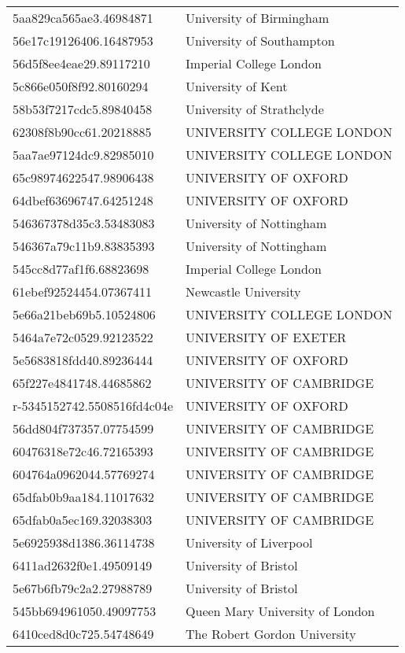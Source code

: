 \begin{tabular}{ll}
5aa829ca565ae3.46984871 & University of Birmingham \\
56e17c19126406.16487953 & University of Southampton \\
56d5f8ee4eae29.89117210 & Imperial College London \\
5c866e050f8f92.80160294 & University of Kent \\
58b53f7217cdc5.89840458 & University of Strathclyde \\
62308f8b90cc61.20218885 & UNIVERSITY COLLEGE LONDON \\
5aa7ae97124dc9.82985010 & UNIVERSITY COLLEGE LONDON \\
65c98974622547.98906438 & UNIVERSITY OF OXFORD \\
64dbef63696747.64251248 & UNIVERSITY OF OXFORD \\
546367378d35c3.53483083 & University of Nottingham \\
546367a79c11b9.83835393 & University of Nottingham \\
545cc8d77af1f6.68823698 & Imperial College London \\
61ebef92524454.07367411 & Newcastle University \\
5e66a21beb69b5.10524806 & UNIVERSITY COLLEGE LONDON \\
5464a7e72c0529.92123522 & UNIVERSITY OF EXETER \\
5e5683818fdd40.89236444 & UNIVERSITY OF OXFORD \\
65f227e4841748.44685862 & UNIVERSITY OF CAMBRIDGE \\
r-5345152742.5508516fd4c04e & UNIVERSITY OF OXFORD \\
56dd804f737357.07754599 & UNIVERSITY OF CAMBRIDGE \\
60476318e72c46.72165393 & UNIVERSITY OF CAMBRIDGE \\
604764a0962044.57769274 & UNIVERSITY OF CAMBRIDGE \\
65dfab0b9aa184.11017632 & UNIVERSITY OF CAMBRIDGE \\
65dfab0a5ec169.32038303 & UNIVERSITY OF CAMBRIDGE \\
5e6925938d1386.36114738 & University of Liverpool \\
6411ad2632f0e1.49509149 & University of Bristol \\
5e67b6fb79c2a2.27988789 & University of Bristol \\
545bb694961050.49097753 & Queen Mary University of London \\
6410ced8d0c725.54748649 & The Robert Gordon University \\

\end{tabular}
